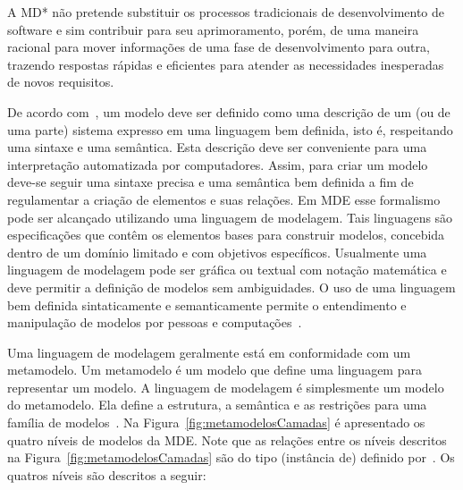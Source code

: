A MD* não pretende substituir os processos tradicionais de desenvolvimento de software e sim contribuir para seu aprimoramento, porém, de uma maneira racional para mover informações de uma fase de desenvolvimento para outra, trazendo respostas rápidas e eficientes para atender as necessidades inesperadas de novos requisitos.

De acordo com~, um modelo deve ser definido como uma descrição de um (ou de uma parte) sistema expresso em uma linguagem bem definida, isto é, respeitando uma sintaxe e uma semântica. Esta descrição deve ser conveniente para uma interpretação automatizada por computadores. Assim, para criar um modelo deve-se seguir uma sintaxe precisa e uma semântica bem definida a fim de regulamentar a criação de elementos e suas relações. Em MDE esse formalismo pode ser alcançado utilizando uma linguagem de modelagem. Tais linguagens são especificações que contêm os elementos bases para construir modelos, concebida dentro de um domínio limitado e com objetivos específicos. Usualmente uma linguagem de modelagem pode ser gráfica ou textual com notação matemática e deve permitir a definição de modelos sem ambiguidades. O uso de uma linguagem bem definida sintaticamente e semanticamente permite o entendimento e manipulação de modelos por pessoas e computações~\cite{Hutchinson_2011, France_2007, Schmidt_2006}.

Uma linguagem de modelagem geralmente está em conformidade com um metamodelo. Um metamodelo é um modelo que define uma linguagem para representar um modelo. A linguagem de modelagem é simplesmente um modelo do metamodelo. Ela define a estrutura, a semântica e as restrições para uma família de modelos~\cite{Mellor_2004}. Na Figura~\ref{fig:metamodelosCamadas} é apresentado os quatro níveis de modelos da MDE. Note que as relações entre os níveis descritos na Figura~\ref{fig:metamodelosCamadas} são do tipo  (instância de) definido por~. Os quatros níveis são descritos a seguir: 

